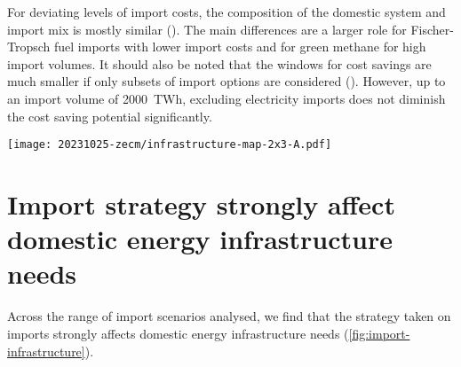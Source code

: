 
For deviating levels of import costs, the composition of the domestic system and
import mix is mostly similar (). The main differences are
a larger role for Fischer-Tropsch fuel imports with lower import costs and for
green methane for high import volumes. It should also be noted that the windows
for cost savings are much smaller if only subsets of import options are
considered (). However, up to an import volume of
2000~TWh, excluding electricity imports does not diminish the cost saving
potential significantly.

\begin{figure*}
    \texttt{[image: 20231025-zecm/infrastructure-map-2x3-A.pdf]}
    \caption{\textbf{Layout of European energy infrastructure for different import scenarios.}
        Left column shows the regional electricity supply mix (pies), added HVDC and HVAC transmission capacity (lines), and the siting of battery storage (choropleth).
        Right column shows the hydrogen supply (top half of pies) and consumption (bottom half of pies), net flow and direction of hydrogen in newly built pipelines (lines), and the siting of hydrogen storage subject to geological potentials (choropleth).
        Total volumes of transmission expansion are given in TWkm, which is the sum product of the capacity and length of individual connections.
    }
    \label{fig:import-infrastructure}
\end{figure*}

\section*{Import strategy strongly affect domestic energy infrastructure needs}

Across the range of import scenarios analysed, we find that the strategy taken
on imports strongly affects domestic energy infrastructure needs
(\cref{fig:import-infrastructure}).


